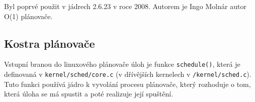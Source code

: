 \documentclass[
  field=ainfk,
  biblatex,
  glossaries,
  index
]{kidiplom}
\begin{document}
Byl poprvé použit v jádrech 2.6.23 v roce 2008. Autorem je Ingo Molnár autor O(1) plánovače.

\subsection{Kostra plánovače}
Vstupní branou do linuxového plánovače úloh je funkce \verb#schedule()#, která je definovaná v \verb#kernel/sched/core.c# (v dřívějších kernelech v \verb#/kernel/sched.c#). Tuto funkci používá jádro k vyvolání procesu plánovače, který rozhoduje o tom, která úloha se má spustit a poté realizuje její spuštění. 

%
%
%
%
%
%
%
%
%
\end{document}
